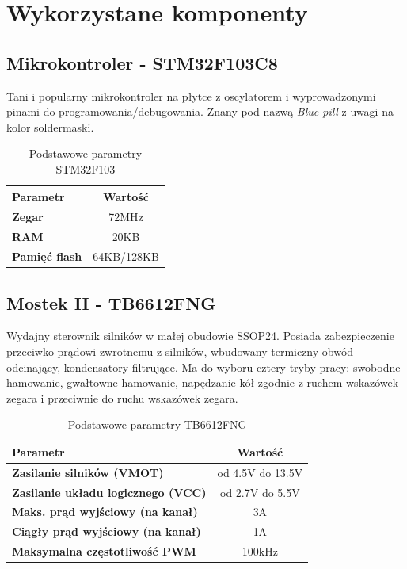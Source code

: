 \documentclass[10pt, a4paper]{article}
\begin{document}
\section{Wykorzystane komponenty}
\subsection{Mikrokontroler - STM32F103C8}
\noindent Tani i popularny mikrokontroler na płytce z oscylatorem i wyprowadzonymi pinami do programowania/debugowania. Znany pod nazwą \textit{Blue pill} z uwagi na kolor soldermaski.

\begin{table}[H]
	\centering
	\begin{tabular}{|l|c|} \hline
		\textbf{Parametr} & Wartość \\
		\hline
		\hline  \textbf{Zegar}& 72MHz\\\hline
		\textbf{RAM} & 20KB\\
		\hline
		\textbf{Pamięć flash} & 64KB/128KB\\
		\hline
	\end{tabular}
	\caption{Podstawowe parametry STM32F103}
	\label{tab:MCU}
\end{table}

\subsection{Mostek H - TB6612FNG}
\noindent Wydajny sterownik silników w małej obudowie SSOP24. Posiada zabezpieczenie przeciwko prądowi zwrotnemu z silników, wbudowany termiczny obwód odcinający, kondensatory filtrujące. Ma do wyboru cztery tryby pracy: swobodne hamowanie, gwałtowne hamowanie, napędzanie kół zgodnie z ruchem wskazówek zegara i przeciwnie do ruchu wskazówek zegara. 

\begin{table}[H]
	\centering
	\begin{tabular}{|l|c|} \hline
		\textbf{Parametr} & Wartość \\
		\hline
		\hline  \textbf{Zasilanie silników (VMOT)}& od 4.5V do 13.5V\\\hline
		\textbf{Zasilanie układu logicznego (VCC)} & od 2.7V do 5.5V\\
		\hline
		\textbf{Maks. prąd wyjściowy (na kanał)} & 3A\\
		\hline
				\textbf{Ciągły prąd wyjściowy (na kanał)} & 1A\\
		\hline
				\textbf{Maksymalna częstotliwość PWM} & 100kHz\\
		\hline
	\end{tabular}
	\caption{Podstawowe parametry TB6612FNG}
	\label{tab:Toshiba}
\end{table}
\end{document}
